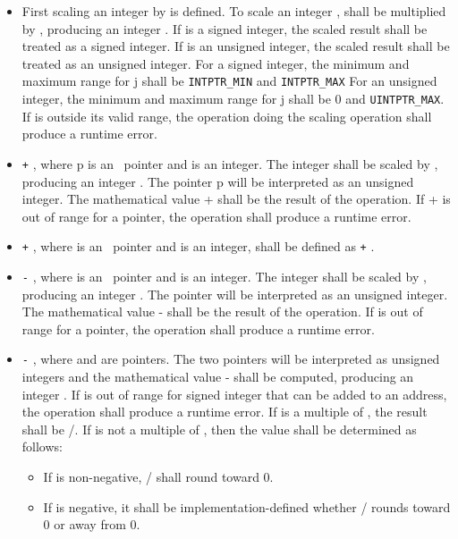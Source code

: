 \begin{itemize}
\item
  First scaling an integer by  is
  defined. To scale an integer ,  shall be multiplied by
  , producing an integer . If
   is a signed integer, the scaled result shall be treated as a
  signed integer. If  is an unsigned integer, the scaled result
  shall be treated as an unsigned integer. For a signed integer, the
  minimum and maximum range for j shall be \texttt{INTPTR\_MIN} and
  \texttt{INTPTR\_MAX} For an unsigned integer, the minimum and maximum
  range for j shall be 0 and \texttt{UINTPTR\_MAX}. If  is
  outside its valid range, the operation doing the scaling operation
  shall produce a runtime error.
\item
   \texttt{+} , where p is an
  \arrayptrT\ pointer
  and  is an integer. The integer  shall be scaled by
  , producing an integer . The
  pointer p will be interpreted as an unsigned integer. The mathematical
  value  +  shall be the result of the operation. If
   +  is out of range for a pointer, the operation shall
  produce a runtime error.
\item
   \texttt{+} , where  is an
  \arrayptrT\ pointer
  and  is an integer, shall be defined as  \texttt{+}
  .
\item
   \texttt{-} , where  is an
  \arrayptrT\ pointer
  and  is an integer. The integer  shall be scaled by
  , producing an integer . The
  pointer  will be interpreted as an unsigned integer. The
  mathematical value  -  shall be the result of the
  operation. If   is out of range for a pointer, the
  operation shall produce a runtime error.
\item
   \texttt{-} , where  and  are
  \arrayptrT
  pointers. The two pointers will be interpreted as unsigned integers
  and the mathematical value  -  shall be computed,
  producing an integer . If  is out of range for signed
  integer that can be added to an address, the operation shall produce a
  runtime error. If  is a multiple of
  , the result shall be
  /. If  is not a
  multiple of , then the value shall
  be determined as follows:

  \begin{itemize}
  \item
    If  is non-negative,
    / shall round toward 0.
  \item
    If  is negative, it shall be implementation-defined whether
    / rounds toward 0 or away
    from 0.
  \end{itemize}
\end{itemize}

